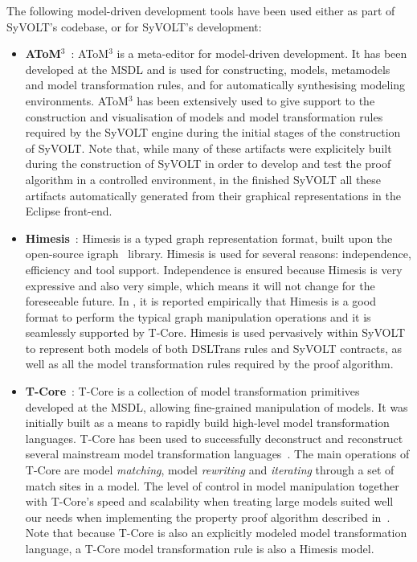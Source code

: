 The following model-driven development tools have been used either as part of
SyVOLT's codebase, or for SyVOLT's development:
\begin{itemize}

  \item \textbf{AToM$^3$}~\cite{}: AToM$^3$ is a meta-editor for model-driven
  development. It has been developed at the MSDL and is used for constructing,
  models, metamodels and model transformation rules, and for automatically
  synthesising modeling environments.
  AToM$^3$ has been extensively used to give support to the construction and
  visualisation of models and model transformation rules required by the SyVOLT
  engine during the initial stages of the construction of SyVOLT. Note that,
  while many of these artifacts were explicitely built during the construction
  of SyVOLT in order to develop and test the proof algorithm in a controlled
  environment, in the finished SyVOLT all these artifacts automatically
  generated from their graphical representations in the Eclipse front-end.\\

  \item \textbf{Himesis}~\cite{Provost2006}: Himesis is a typed graph representation
  format, built upon the open-source igraph~\cite{} library. 
Himesis is used for several reasons: independence, efficiency and tool support.
Independence is ensured because Himesis is very expressive and also very simple,
which means it will not change for the foreseeable future.
In \cite{Syriani2010b}, it is reported empirically that Himesis is a good format
to perform the typical graph manipulation operations and it is seamlessly
supported by T-Core.  
  Himesis is used pervasively within SyVOLT to represent both models of both
  DSLTrans rules and SyVOLT contracts, as well as all the model transformation
  rules required by the proof algorithm.\\
  
  \item \textbf{T-Core}~\cite{Syriani2010a}: T-Core is a collection of model transformation
  primitives developed at the MSDL, allowing fine-grained manipulation of
  models. It was initially built as a means to rapidly build
  high-level model transformation languages. T-Core has been used to
  successfully deconstruct and reconstruct several mainstream model transformation
  languages~\cite{}. The main operations of T-Core are model \emph{matching},
  model \emph{rewriting} and \emph{iterating} through a set of match sites in a model.
  The level of control in model manipulation together with T-Core's speed and
  scalability when treating large models suited well our needs when implementing
  the property proof algorithm described in~\cite{Lucio2014}. Note that because
  T-Core is also an explicitly modeled model transformation language, a T-Core
  model transformation rule is also a Himesis model.\\


\end{itemize}
